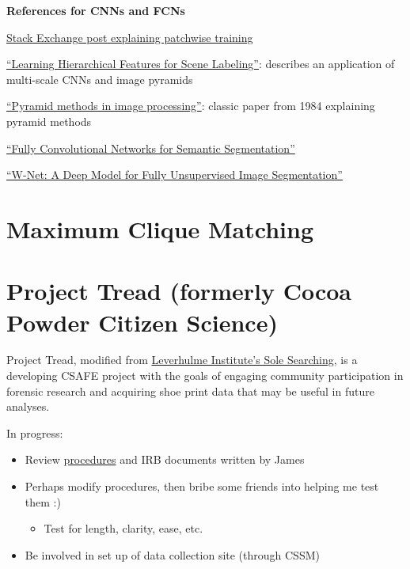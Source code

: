 \documentclass[]{book}
\providecommand{\tightlist}{%
  \setlength{\itemsep}{0pt}\setlength{\parskip}{0pt}}
\begin{document}
\textbf{References for CNNs and FCNs}

\href{https://stats.stackexchange.com/questions/266075/patch-wise-training-and-fully-convolutional-training-in-fully-convolutional-neur}{Stack Exchange post explaining patchwise training}

\href{https://ieeexplore.ieee.org/abstract/document/6338939}{``Learning Hierarchical Features for Scene Labeling''}: describes an application of multi-scale CNNs and image pyramids

\href{http://citeseerx.ist.psu.edu/viewdoc/summary?doi=10.1.1.56.8646}{``Pyramid methods in image processing''}: classic paper from 1984 explaining pyramid methods

\href{https://people.eecs.berkeley.edu/~jonlong/long_shelhamer_fcn.pdf}{``Fully Convolutional Networks for Semantic Segmentation''}

\href{https://arxiv.org/pdf/1711.08506.pdf}{``W-Net: A Deep Model for Fully Unsupervised Image Segmentation''}

\hypertarget{maxclique}{%
\section{Maximum Clique Matching}\label{maxclique}}

\hypertarget{cocoa}{%
\section{Project Tread (formerly Cocoa Powder Citizen Science)}\label{cocoa}}

Project Tread, modified from \href{https://www.dundee.ac.uk/leverhulme/citizenscience/details/sole-searching.php}{Leverhulme Institute's Sole Searching}, is a developing CSAFE project with the goals of engaging community participation in forensic research and acquiring shoe print data that may be useful in future analyses.

In progress:

\begin{itemize}
\tightlist
\item
  Review \href{https://forensicstats.org/project-tread/}{procedures} and IRB documents written by James
\item
  Perhaps modify procedures, then bribe some friends into helping me test them :)

  \begin{itemize}
  \tightlist
  \item
    Test for length, clarity, ease, etc.
  \end{itemize}
\item
  Be involved in set up of data collection site (through CSSM)
\end{itemize}
\end{document}
